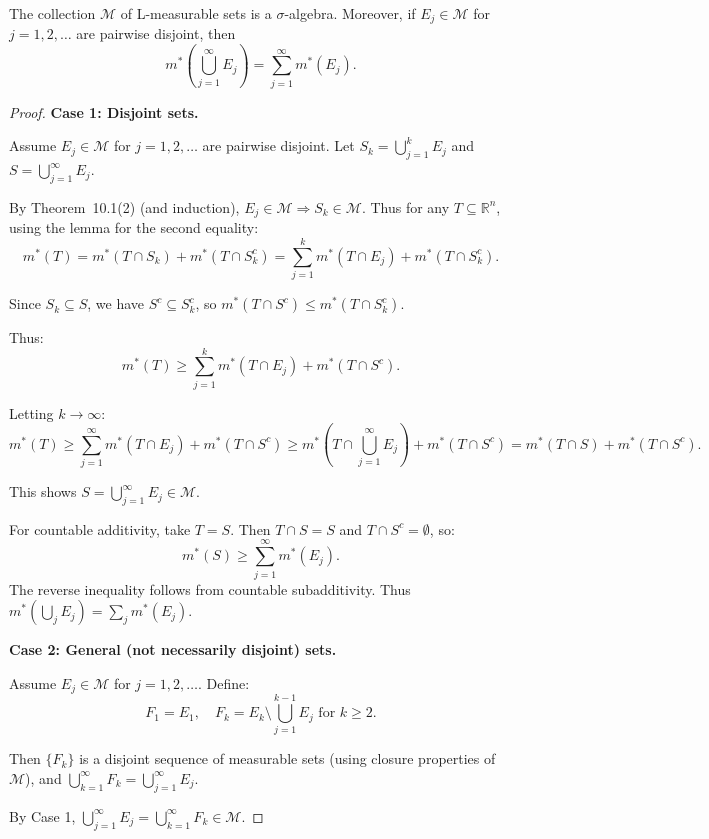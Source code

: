 \documentclass[11pt]{report}
\begin{document}
\begin{thmbox}
The collection $\mathcal{M}$ of L-measurable sets is a $\sigma$-algebra. Moreover, if $E_j \in \mathcal{M}$ for $j = 1, 2, \ldots$ are pairwise disjoint, then
\[
m^*\left( \bigcup_{j=1}^{\infty} E_j \right) = \sum_{j=1}^{\infty} m^*(E_j).
\]
\end{thmbox}

\begin{proof}
\textbf{Case 1: Disjoint sets.}

Assume $E_j \in \mathcal{M}$ for $j = 1, 2, \ldots$ are pairwise disjoint. Let $S_k = \bigcup_{j=1}^{k} E_j$ and $S = \bigcup_{j=1}^{\infty} E_j$.

By Theorem~10.1(2) (and induction), $E_j \in \mathcal{M} \Rightarrow S_k \in \mathcal{M}$. Thus for any $T \subseteq \mathbb{R}^n$, using the lemma for the second equality:
\[
m^*(T) = m^*(T \cap S_k) + m^*(T \cap S_k^c) = \sum_{j=1}^{k} m^*(T \cap E_j) + m^*(T \cap S_k^c).
\]

Since $S_k \subseteq S$, we have $S^c \subseteq S_k^c$, so $m^*(T \cap S^c) \leq m^*(T \cap S_k^c)$.

Thus:
\[
m^*(T) \geq \sum_{j=1}^{k} m^*(T \cap E_j) + m^*(T \cap S^c).
\]

Letting $k \to \infty$:
\[
m^*(T) \geq \sum_{j=1}^{\infty} m^*(T \cap E_j) + m^*(T \cap S^c) \geq m^*\left( T \cap \bigcup_{j=1}^{\infty} E_j \right) + m^*(T \cap S^c) = m^*(T \cap S) + m^*(T \cap S^c).
\]

This shows $S = \bigcup_{j=1}^{\infty} E_j \in \mathcal{M}$.

For countable additivity, take $T = S$. Then $T \cap S = S$ and $T \cap S^c = \emptyset$, so:
\[
m^*(S) \geq \sum_{j=1}^{\infty} m^*(E_j).
\]
The reverse inequality follows from countable subadditivity. Thus $m^*(\bigcup_j E_j) = \sum_j m^*(E_j)$.

\textbf{Case 2: General (not necessarily disjoint) sets.}

Assume $E_j \in \mathcal{M}$ for $j = 1, 2, \ldots$. Define:
\[
F_1 = E_1, \quad F_k = E_k \setminus \bigcup_{j=1}^{k-1} E_j \text{ for } k \geq 2.
\]

Then $\{F_k\}$ is a disjoint sequence of measurable sets (using closure properties of $\mathcal{M}$), and $\bigcup_{k=1}^{\infty} F_k = \bigcup_{j=1}^{\infty} E_j$.

By Case 1, $\bigcup_{j=1}^{\infty} E_j = \bigcup_{k=1}^{\infty} F_k \in \mathcal{M}$.
\end{proof}
\end{document}
